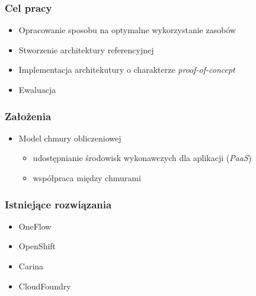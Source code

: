 \documentclass{beamer}
\begin{document}
\begin{frame}
\frametitle{Cel pracy}

\begin{itemize}
\item Opracowanie sposobu na optymalne wykorzystanie zasobów

\item Stworzenie architektury referencyjnej
\item Implementacja architekutury o charakterze \textit{proof-of-concept}
\item Ewaluacja
\end{itemize}

\end{frame}





\begin{frame}
\frametitle{Założenia}

\begin{itemize}
\item Model chmury obliczeniowej
	\begin{itemize}
		\item udostępnianie środowisk wykonawczych dla aplikacji (\textit{PaaS})
		\item współpraca między chmurami
	\end{itemize}
\end{itemize}

\end{frame}





\begin{frame}
\frametitle{Istniejące rozwiązania}

\begin{itemize}
\item OneFlow
\item OpenShift

\item Carina
\item CloudFoundry
\end{itemize}

\end{frame}
\end{document}
